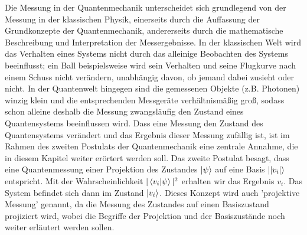 Die Messung in der Quantenmechanik unterscheidet sich grundlegend von der Messung in der klassischen Physik, einerseits durch die Auffassung der Grundkonzepte der Quantenmechanik, andererseits durch die mathematische Beschreibung und Interpretation der Messergebnisse.
In der klassischen Welt wird das Verhalten eines Systems nicht durch das alleinige Beobachten des Systems beeinflusst; ein Ball beispielsweise wird sein Verhalten und seine Flugkurve nach einem Schuss nicht verändern, unabhängig davon, ob jemand dabei zusieht oder nicht.
In der Quantenwelt hingegen sind die gemessenen Objekte (z.B. Photonen) winzig klein und die entsprechenden Messgeräte verhältnismäßig groß, sodass schon alleine deshalb die Messung zwangsläufig den Zustand eines Quantensystems beeinflussen wird. 
Dass eine Messung den Zustand des Quantensystems verändert und das Ergebnis dieser Messung zufällig ist, ist im Rahmen des zweiten Postulats der Quantenmechanik eine zentrale Annahme, die in diesem Kapitel weiter erörtert werden soll. 
Das zweite Postulat besagt, dass eine Quantenmessung einer Projektion des Zustandes $\ket{\psi}$ auf eine Basis $\ket{|v_i|}$ entspricht. Mit der Wahrscheinlichkeit $|\braket{v_i|\psi}|^2$ erhalten wir das Ergebnis $v_i$. Das System befindet sich dann im Zustand $\ket{v_i}$. \cite{lvovsky_quantum_2018} 
\newline Dieses Konzept wird auch 'projektive Messung' genannt, da die Messung des Zustandes auf einen Basiszustand projiziert wird, wobei die Begriffe der Projektion und der Basiszustände noch weiter erläutert werden sollen. \\
\\


